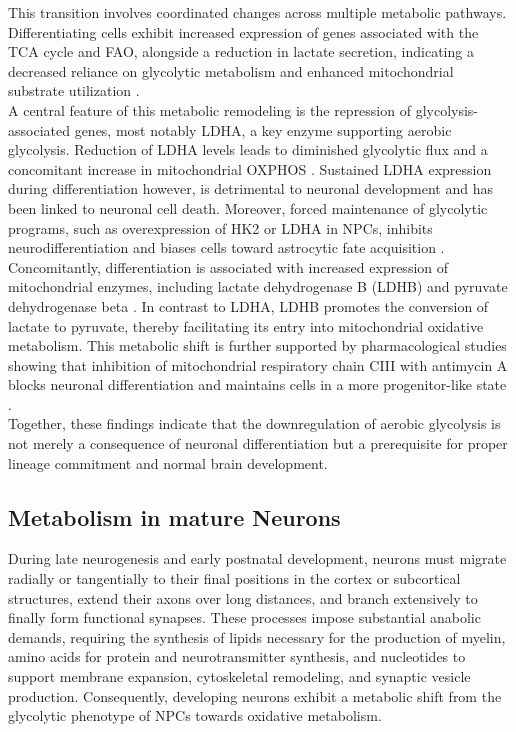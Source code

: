 This transition involves coordinated changes across multiple metabolic pathways. Differentiating cells exhibit increased expression of genes associated with the TCA cycle and FAO, alongside a reduction in lactate secretion, indicating a decreased reliance on glycolytic metabolism and enhanced mitochondrial substrate utilization \citep{LANGEReliefHypoxiaAngiogenesis2016,DONGMetabolicLactateProduction2022,TELLEYSequentialTranscriptionalWaves2016}.
\\

A central feature of this metabolic remodeling is the repression of glycolysis-associated genes, most notably LDHA, a key enzyme supporting aerobic glycolysis.  Reduction of LDHA levels leads to diminished glycolytic flux and a concomitant increase in mitochondrial OXPHOS \citep{FANTINAttenuationLDHAExpression2006}. Sustained LDHA expression during differentiation however, is detrimental to neuronal development and has been linked to neuronal cell death. Moreover, forced maintenance of glycolytic programs, such as overexpression of HK2 or LDHA in NPCs, inhibits neurodifferentiation and biases cells toward astrocytic fate acquisition \citep{ZHENGMetabolicReprogrammingNeuronal2016}. 
\\

Concomitantly, differentiation is associated with increased expression of mitochondrial enzymes, including lactate dehydrogenase B (\gls{LDHB}) and pyruvate dehydrogenase beta \citep{FATHIQuantitativeProteomicsAnalysis2014}.
In contrast to LDHA, LDHB promotes the conversion of lactate to pyruvate, thereby facilitating its entry into mitochondrial oxidative metabolism. This metabolic shift is further supported by pharmacological studies showing that inhibition of mitochondrial respiratory chain CIII  with antimycin A blocks neuronal differentiation and maintains cells in a more progenitor-like state \citep{PEREIRAInhibitionMitochondrialComplex2013}.
\\

Together, these findings indicate that the downregulation of aerobic glycolysis is not merely a consequence of neuronal differentiation but a prerequisite for proper lineage commitment and normal brain development.

\subsection{Metabolism in mature Neurons}
During late neurogenesis and early postnatal development, neurons must migrate radially or tangentially to their final positions in the cortex or subcortical structures, extend their axons over long distances, and branch extensively to finally form functional synapses. These processes impose substantial anabolic demands, requiring the synthesis of lipids necessary for the production of myelin, amino acids for protein and neurotransmitter synthesis, and nucleotides to support membrane expansion, cytoskeletal remodeling, and synaptic vesicle production. Consequently, developing neurons exhibit a metabolic shift from the glycolytic phenotype of NPCs towards oxidative metabolism.
\\

